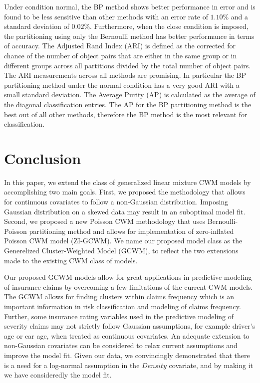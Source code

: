 \documentclass[11pt,letterpaper]{article}
\numberwithin{equation}{section}
\numberwithin{equation}{section}
\numberwithin{equation}{section}
\begin{document}
 Under condition normal, the BP method shows better performance in error and is found to be less sensitive than other methods with an error rate of $ 1.10 \% $ and a standard deviation of $ 0.02 \% $.  Furthermore, when the close condition is imposed, the partitioning using only the Bernoulli method has better performance in terms of accuracy. The Adjusted Rand Index (ARI) is defined as the corrected for chance of the number of object pairs that are either in the same group or in different groups across all partitions divided by the total number of object pairs.
 The ARI measurements across all methods are promising. In particular the BP partitioning method under the normal condition has a very good ARI with a small standard deviation. The Average Purity (AP) is calculated as the average of the diagonal classification entries. 
The AP for the BP partitioning method is the best out of all other methods, therefore the BP method is the most relevant for classification.

\section{Conclusion}

In this paper, we extend the class of generalized linear mixture CWM models by accomplishing two main goals. First, we proposed the methodology that allows for continuous covariates to follow a non-Gaussian distribution. Imposing Gaussian distribution on a skewed data may result in an suboptimal model fit. Second, we proposed a new Poisson CWM methodology that uses Bernoulli-Poisson partitioning method and allows for implementation of zero-inflated Poisson CWM model (ZI-GCWM). We name our proposed model class as the Generelized Cluster-Weighted Model (GCWM), to reflect the two extensions made to the existing CWM class of models.

Our proposed GCWM models allow for great applications in predictive modeling of insurance claims by overcoming a few limitations of the current CWM models. The GCWM allows for finding clusters within claims frequency which is an important information in risk classification and modeling of claims frequency. Further, some insurance rating variables used in the predictive modeling of severity claims may not strictly follow Gaussian assumptions, for example driver's age or car age, when treated as continuous covariates. An adequate extension to non-Gaussian covariates can be considered to relax current assumptions and improve the model fit. Given our data, we convincingly demonstrated that there is a need for a log-normal assumption in the $Density$ covariate, and by making it we have consideredly the model fit. 
\end{document}
